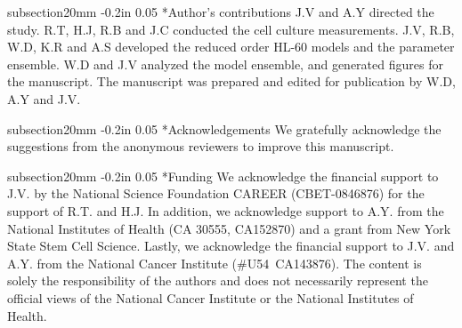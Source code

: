 \documentclass[12pt]{article}
\makeatletter
\renewcommand\section{\@startsection
	{subsection}{2}{0mm}
	{-0.2in}
	{0.05\baselineskip}
	{\normalfont\large\bfseries}}
\makeatother
\begin{document}
\section*{Author's contributions}
J.V and A.Y directed the study. R.T, H.J, R.B and J.C conducted the cell culture measurements.
J.V, R.B, W.D, K.R and A.S developed the reduced order HL-60 models and the parameter ensemble.
W.D and J.V analyzed the model ensemble, and generated figures for the manuscript.
The manuscript was prepared and edited for publication by W.D, A.Y and J.V.

\section*{Acknowledgements}
We gratefully acknowledge the suggestions from the anonymous reviewers to improve this manuscript.

\section*{Funding}
We acknowledge the financial support to J.V. by the National Science Foundation CAREER (CBET-0846876) for the support of R.T. and H.J.
In addition, we acknowledge support to A.Y. from the National Institutes of Health (CA 30555, CA152870)
and a grant from New York State Stem Cell Science.
Lastly, we acknowledge the financial support to J.V. and A.Y. from the National Cancer Institute (\#U54~CA143876).
The content is solely the responsibility of the authors and does not necessarily
represent the official views of the National Cancer Institute or the National Institutes of Health.

\clearpage



\clearpage
\end{document}
